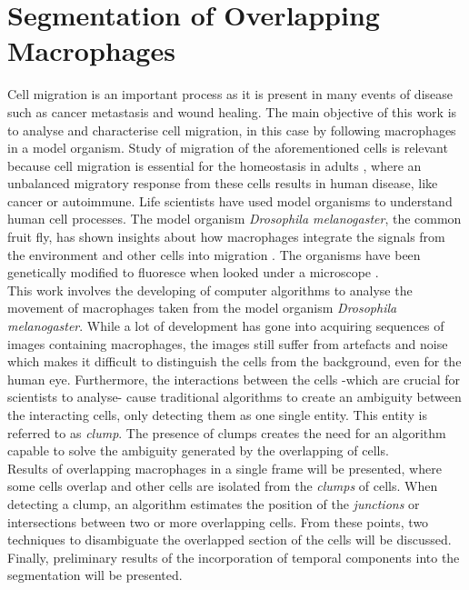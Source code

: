   \section*{Segmentation of Overlapping Macrophages}
%
Cell migration is an important process as it is present in many events of 
disease such as cancer metastasis and wound healing. 
The main objective of this work is to analyse and characterise cell 
migration, in this case by following macrophages in a model organism.
Study of migration of the aforementioned cells is relevant because 
cell migration is essential for the homeostasis in adults \cite{pocha2014}, 
where an unbalanced migratory response from these cells results in 
human disease, like cancer or autoimmune.
Life scientists have used model organisms to understand human cell processes.
The model organism \emph{Drosophila melanogaster}, the common fruit fly,
has shown insights about how macrophages integrate the signals
from the environment and other cells into migration \cite{wood2017}.
The organisms have been genetically modified to fluoresce
when looked under a microscope \cite{Stramer2010}.
\medskip\\
%
This work involves the developing of computer algorithms to analyse the
movement of macro\-phages taken from the model organism
\emph{Drosophila melanogaster}. While a lot of development
has gone into acquiring sequences of images containing macrophages,
the images still suffer from artefacts and noise which makes it difficult
to distinguish the cells from the background, even for the human eye.
Furthermore, the interactions between the cells -which are crucial for scientists
to analyse- cause traditional algorithms \cite{Henry2013,lu2015,Caselles}
to create an ambiguity between the interacting cells, only detecting them 
as one single entity. This entity is referred to as \emph{clump}. 
The presence of clumps creates the need for an algorithm capable to solve 
the ambiguity generated by the overlapping of cells.
\medskip\\
%
Results of overlapping macrophages in a single frame will be
presented, where some cells overlap and other cells are
isolated from the \emph{clumps} of cells. When detecting a clump,
an algorithm estimates the position of the \emph{junctions} or intersections
between two or more overlapping cells. From these points, two techniques
to disambiguate the overlapped section of the cells will be discussed.
Finally, preliminary results of the incorporation of temporal components
into the segmentation will be presented.
